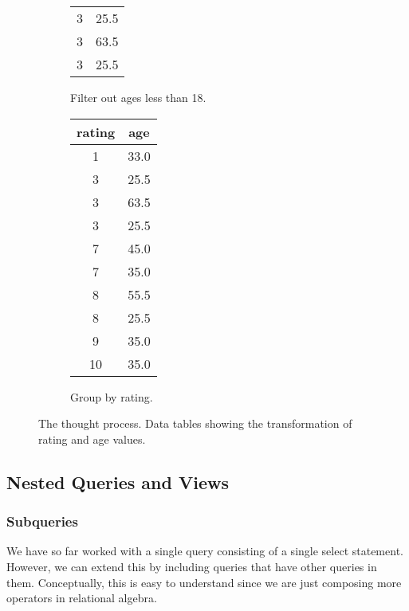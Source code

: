 \begin{example}
\begin{figure}[H]
\begin{subfigure}[b]{0.32\textwidth}
\begin{tabular}{|c|c|}
            3 & 25.5 \\
            3 & 63.5 \\
            3 & 25.5 \\
            \hline
          \end{tabular}
          \caption{Filter out ages less than 18.}
          \label{fig:table2}
        \end{subfigure}
        \hfill 
        \begin{subfigure}[b]{0.32\textwidth}
          \centering
          \begin{tabular}{|c|c|}
            \hline
            rating & age \\
            \hline
            1 & 33.0 \\
            \hline 
            3 & 25.5 \\
            3 & 63.5 \\
            3 & 25.5 \\
            \hline 
            7 & 45.0 \\
            7 & 35.0 \\
            \hline 
            8 & 55.5 \\
            8 & 25.5 \\
            \hline 
            9 & 35.0 \\
            \hline 
            10 & 35.0 \\
            \hline
          \end{tabular}
          \caption{Group by rating.}
          \label{fig:table3}
        \end{subfigure}
        \caption{The thought process. Data tables showing the transformation of rating and age values. }
        \label{fig:rating-age-tables}
      \end{figure}
    \end{example}

\subsection{Nested Queries and Views} 

  \subsubsection{Subqueries}

    We have so far worked with a single query consisting of a single select statement. However, we can extend this by including queries that have other queries in them. Conceptually, this is easy to understand since we are just composing more operators in relational algebra. 

